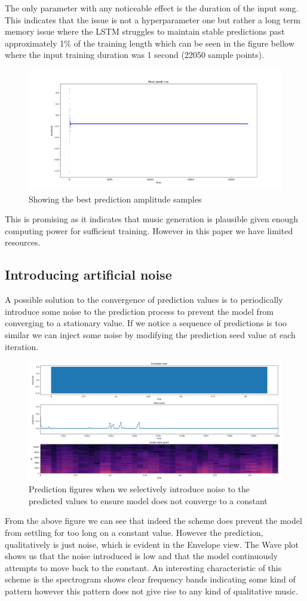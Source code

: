 \documentclass{article}
\begin{document}
The only parameter with any noticeable effect is the duration of the input song. This indicates that the issue is not a hyperparameter one but rather a long term memory issue where the LSTM struggles to maintain stable predictions past approximately 1\% of the training length which can be seen in the figure bellow where the input training duration was 1 second (22050 sample points).  
\begin{figure}[H]
\caption{Showing the best prediction amplitude samples}
\includegraphics[scale=0.35]{better_convergence.png}
\end{figure}
This is promising as it indicates that music generation is plausible given enough computing power for sufficient training. However in this paper we have limited resources. 
\subsection{Introducing artificial noise}
A possible solution to the convergence of prediction values is to periodically introduce some noise to the prediction process to prevent the model from converging to a stationary value. If we notice a sequence of predictions is too similar we can inject some noise by modifying the prediction seed value at each iteration. 
\begin{figure}[H]
\caption{Prediction figures when we selectively introduce noise to the predicted values to ensure model does not converge to a constant}
\includegraphics[scale=0.35]{introduction_of_noise.png}
\end{figure}
From the above figure we can see that indeed the scheme does prevent the model from settling for too long on a constant value. However the prediction, qualitatively is just noise, which is evident in the Envelope view. The Wave plot shows us that the noise introduced is low and that the model continuously attempts to move back to the constant. An interesting characteristic of this scheme is the spectrogram shows clear frequency bands indicating some kind of pattern however this pattern does not give rise to any kind of qualitative music. 
\end{document}
